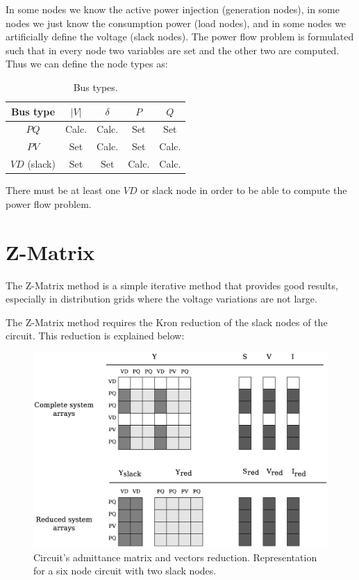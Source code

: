 \documentclass[a4paper,twoside,fleqn]{tufte-book}
\begin{document}
In some nodes we know the active power injection (generation nodes), in some nodes we just know the consumption power (load nodes), and in some nodes we artificially define the voltage (slack nodes). The power flow problem is formulated such that in every node two variables are set and the other two are computed. Thus we can define the node types as:

\begin{table}[h!]
	\begin{center}
		\begin{tabular}{ccccc}
			\toprule
			
			Bus type & $|V|$ &  $\delta$ & $P$ & $Q$\\
			
			\midrule
			
			$PQ$ & Calc. &  Calc. & Set & Set\\
			$PV$ & Set &  Calc. & Set & Calc.\\
			$VD$ (slack) & Set &  Set & Calc. & Calc.\\
			
			
			\bottomrule
		\end{tabular}
	\end{center}
	\caption{Bus types.}
	\label{bus__types}
\end{table}

There must be at least one $VD$ or slack node in order to be able to compute the power flow problem. 



\section{Z-Matrix}

The Z-Matrix method is a simple iterative method that provides good results, especially in distribution grids where the voltage variations are not large.

The Z-Matrix method requires the Kron reduction of the slack nodes of the circuit. This reduction is explained below:

\begin{figure}[h!]
  \includegraphics[width=\linewidth]{img/Matrix_reduction.eps}
  \caption{Circuit's admittance matrix and vectors reduction. Representation for a six node circuit with two slack nodes.}
  \label{fig:reduction}
\end{figure}
\end{document}
